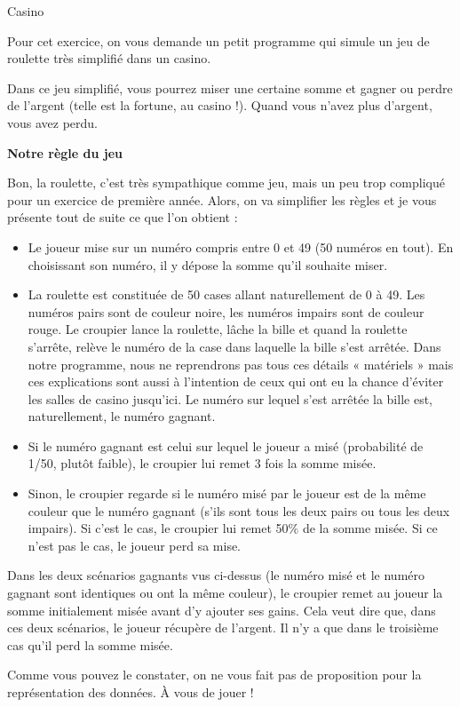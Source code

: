 \begin{Exercice}{Casino}

	Pour cet exercice,
	on vous demande un petit programme qui simule un jeu de roulette
	très simplifié dans un casino.
	
	Dans ce jeu simplifié, vous pourrez miser une certaine somme 
	et gagner ou perdre de l'argent (telle est la fortune, au casino !). 
	Quand vous n'avez plus d'argent, vous avez perdu.

	\textbf{Notre règle du jeu}

	Bon, la roulette, c'est très sympathique comme jeu, 
	mais un peu trop compliqué pour un exercice de première année.
	Alors, on va simplifier les règles et je vous présente tout de suite 
	ce que l'on obtient :
	\begin{itemize}
	\item
		Le joueur mise sur un numéro compris entre 0 et 49 (50 numéros en tout). 
		En choisissant son numéro, il y dépose la somme qu'il souhaite miser.
	\item
		La roulette est constituée de 50 cases allant naturellement de 0 à 49. 
		Les numéros pairs sont de couleur noire, 
		les numéros impairs sont de couleur rouge. 
		Le croupier lance la roulette, 
		lâche la bille et quand la roulette s'arrête, 
		relève le numéro de la case dans laquelle la bille s'est arrêtée. 
		Dans notre programme, nous ne reprendrons pas tous ces détails 
		« matériels » mais ces explications sont aussi à l'intention 
		de ceux qui ont eu la chance d'éviter les salles de casino jusqu'ici. 
		Le numéro sur lequel s'est arrêtée la bille est, naturellement, 
		le numéro gagnant.
	\item
		Si le numéro gagnant est celui sur lequel le joueur a misé 
		(probabilité de 1/50, plutôt faible), 
		le croupier lui remet 3 fois la somme misée.
	\item
		Sinon, le croupier regarde si le numéro misé par le joueur 
		est de la même couleur que le numéro gagnant 
		(s'ils sont tous les deux pairs ou tous les deux impairs). 
		Si c'est le cas, le croupier lui remet 50\% de la somme misée. 
		Si ce n'est pas le cas, le joueur perd sa mise.
	\end{itemize}
	
	Dans les deux scénarios gagnants vus ci-dessus 
	(le numéro misé et le numéro gagnant sont identiques ou ont la même couleur), 
	le croupier remet au joueur la somme initialement misée avant d'y ajouter ses gains. 
	Cela veut dire que, dans ces deux scénarios, le joueur récupère de l'argent. 
	Il n'y a que dans le troisième cas qu'il perd la somme misée.
	
	Comme vous pouvez le constater,
	on ne vous fait pas de proposition pour la représentation des données.
	À vous de jouer !
\end{Exercice}

